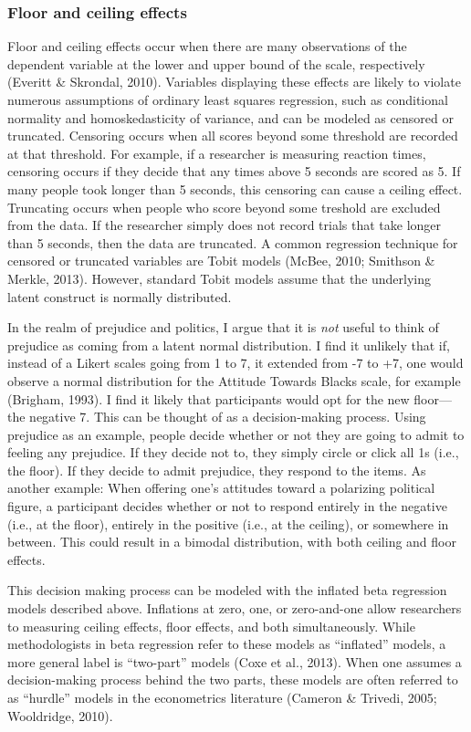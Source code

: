 \documentclass[english,man]{apa6}
\theoremstyle{definition}
\theoremstyle{definition}
\theoremstyle{remark}
\begin{document}
\subsubsection{Floor and ceiling
effects}\label{floor-and-ceiling-effects}

Floor and ceiling effects occur when there are many observations of the
dependent variable at the lower and upper bound of the scale,
respectively (Everitt \& Skrondal, 2010). Variables displaying these
effects are likely to violate numerous assumptions of ordinary least
squares regression, such as conditional normality and homoskedasticity
of variance, and can be modeled as censored or truncated. Censoring
occurs when all scores beyond some threshold are recorded at that
threshold. For example, if a researcher is measuring reaction times,
censoring occurs if they decide that any times above 5 seconds are
scored as 5. If many people took longer than 5 seconds, this censoring
can cause a ceiling effect. Truncating occurs when people who score
beyond some treshold are excluded from the data. If the researcher
simply does not record trials that take longer than 5 seconds, then the
data are truncated. A common regression technique for censored or
truncated variables are Tobit models (McBee, 2010; Smithson \& Merkle,
2013). However, standard Tobit models assume that the underlying latent
construct is normally distributed.

In the realm of prejudice and politics, I argue that it is \emph{not}
useful to think of prejudice as coming from a latent normal
distribution. I find it unlikely that if, instead of a Likert scales
going from 1 to 7, it extended from -7 to +7, one would observe a normal
distribution for the Attitude Towards Blacks scale, for example
(Brigham, 1993). I find it likely that participants would opt for the
new floor---the negative 7. This can be thought of as a decision-making
process. Using prejudice as an example, people decide whether or not
they are going to admit to feeling any prejudice. If they decide not to,
they simply circle or click all 1s (i.e., the floor). If they decide to
admit prejudice, they respond to the items. As another example: When
offering one's attitudes toward a polarizing political figure, a
participant decides whether or not to respond entirely in the negative
(i.e., at the floor), entirely in the positive (i.e., at the ceiling),
or somewhere in between. This could result in a bimodal distribution,
with both ceiling and floor effects.

This decision making process can be modeled with the inflated beta
regression models described above. Inflations at zero, one, or
zero-and-one allow researchers to measuring ceiling effects, floor
effects, and both simultaneously. While methodologists in beta
regression refer to these models as \enquote{inflated} models, a more
general label is \enquote{two-part} models (Coxe et al., 2013). When one
assumes a decision-making process behind the two parts, these models are
often referred to as \enquote{hurdle} models in the econometrics
literature (Cameron \& Trivedi, 2005; Wooldridge, 2010).
\end{document}
